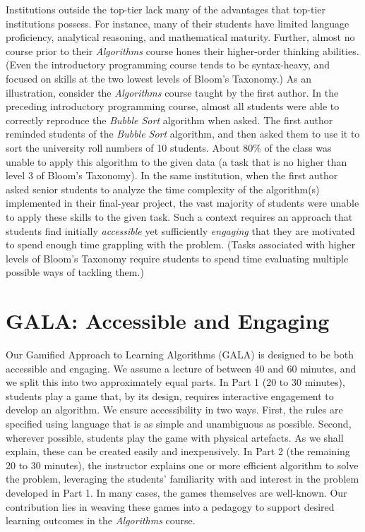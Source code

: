 \begin{multicols}{2}
Institutions outside the top-tier lack many of the advantages that top-tier institutions possess. For instance, many of their students have limited language proficiency, analytical reasoning, and mathematical maturity. Further, almost no course prior to their \textit{Algorithms} course hones their higher-order thinking abilities. (Even the introductory programming course tends to be syntax-heavy, and focused on skills at the two lowest levels of Bloom’s Taxonomy.) As an illustration, consider the \textit{Algorithms} course taught by the first author. In the preceding introductory programming course, almost all students were able to correctly reproduce the \textit{Bubble Sort} algorithm when asked. The first author reminded students of the \textit{Bubble Sort} algorithm, and then asked them to use it to sort the university roll numbers of 10 students. About 80\% of the class was unable to apply this algorithm to the given data (a task that is no higher than level 3 of Bloom’s Taxonomy). In the same institution, when the first author asked senior students to analyze the time complexity of the algorithm(s) implemented in their final-year project, the vast majority of students were unable to apply these skills to the given task. Such a context requires an approach that students find initially \textit{accessible} yet sufficiently \textit{engaging} that they are motivated to spend enough time grappling with the problem. (Tasks associated with higher levels of Bloom's Taxonomy require students to spend time evaluating multiple possible ways of tackling them.)  
 
\vspace{-.3cm}   
 
\section{GALA: Accessible and Engaging}\label{section-2}  
  
\vspace{-.2cm} 
  
Our Gamified Approach to Learning Algorithms (GALA) is designed to be both accessible and engaging. We assume a lecture of between 40 and 60 minutes, and we split this into two approximately equal parts. In Part 1 (20 to 30 minutes), students play a game that, by its design, requires interactive engagement to develop an algorithm. We ensure accessibility in two ways. First, the rules are specified using language that is as simple and unambiguous as possible. Second, wherever possible, students play the game with physical artefacts. As we shall explain, these can be created easily and inexpensively. In Part 2 (the remaining 20 to 30 minutes), the instructor explains one or more efficient algorithm to solve the problem, leveraging the students’ familiarity with and interest in the problem developed in Part 1. In many cases, the games themselves are well-known. Our contribution lies in weaving these games into a pedagogy to support desired learning outcomes in the \textit{Algorithms} course.  
  

\end{multicols}
